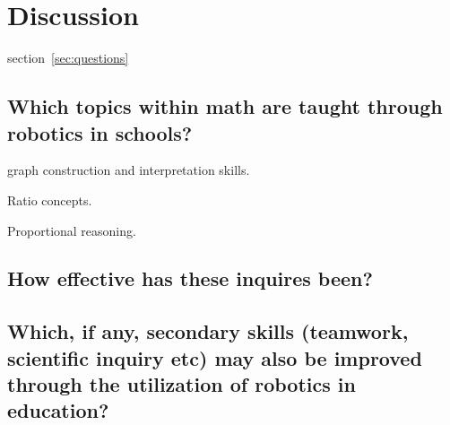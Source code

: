 \section*{Discussion}
section~\ref{sec:questions}
\subsection*{Which topics within math are taught through robotics in schools?}
 graph construction and interpretation skills.

\bigskip\noindent
{} Ratio concepts. 

\bigskip\noindent
{} Proportional reasoning.

\subsection*{How effective has these inquires been?}


\subsection*{Which, if any, secondary skills (teamwork, scientific inquiry etc) may also be improved through the utilization of robotics in education?}

